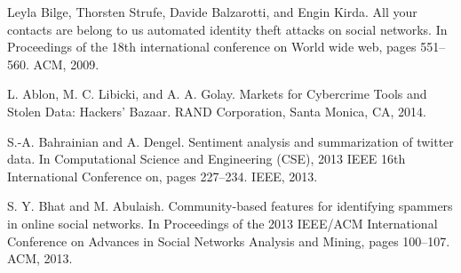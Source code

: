 \documentclass[conference]{IEEEtran}
\begin{document}
\begin{enumerate}[label={[\arabic*]}]
\item Leyla Bilge, Thorsten Strufe, Davide Balzarotti, and
Engin Kirda. All your contacts are belong to us
automated identity theft attacks on social networks. In
Proceedings of the 18th international conference on
World wide web, pages 551–560. ACM, 2009.
\item L. Ablon, M. C. Libicki, and A. A. Golay. Markets
for Cybercrime Tools and Stolen Data: Hackers’
Bazaar. RAND Corporation, Santa Monica, CA,
2014.
\item S.-A. Bahrainian and A. Dengel. Sentiment analysis
and summarization of twitter data. In Computational
Science and Engineering (CSE), 2013 IEEE 16th
International Conference on, pages 227–234. IEEE,
2013.
\item S. Y. Bhat and M. Abulaish. Community-based
features for identifying spammers in online social
networks. In Proceedings of the 2013 IEEE/ACM
International Conference on Advances in Social Networks Analysis and Mining, pages 100–107. ACM,
2013.

\end{enumerate}
\end{document}
